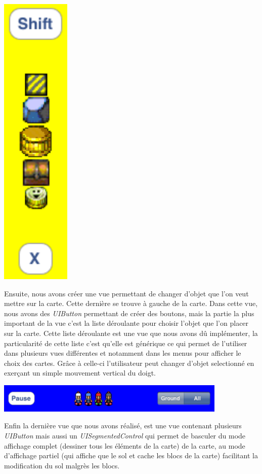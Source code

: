 		\begin{center}
			\includegraphics{./Developpement/Img/menu_droite.pdf}
		\end{center}
			
		Ensuite, nous avons créer une vue permettant de changer d'objet que l'on veut mettre sur la carte. Cette dernière se trouve à gauche de la carte. Dans cette vue, nous avons des \textit{UIButton} permettant de créer des boutons, mais la partie la plus important de la vue c'est la liste déroulante pour choisir l'objet que l'on placer sur la carte. Cette liste déroulante est une vue que nous avons dû implémenter, la particularité de cette liste c'est qu'elle est générique ce qui permet de l'utiliser dans plusieurs vues différentes et notamment dans les menus pour afficher le choix des cartes. Grâce à celle-ci l'utilisateur peut changer d'objet selectionné en exerçant un simple mouvement vertical du doigt.
			
		\begin{center}
			\includegraphics[width=11cm]{./Developpement/Img/menu_haut.pdf}
		\end{center}
		Enfin la dernière vue que nous avons réalisé, est une vue contenant plusieurs \textit{UIButton} mais aussi un \textit{UISegmentedControl} qui permet de basculer du mode affichage complet (dessiner tous les éléments de la carte) de la carte, au mode d'affichage partiel (qui affiche que le sol et cache les blocs de la carte) facilitant la modification du sol malgrès les blocs.
			

